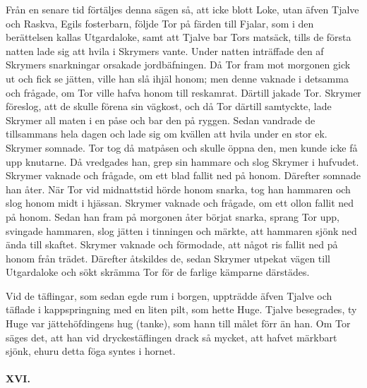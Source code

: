 Från en senare tid förtäljes denna sägen så, att icke blott Loke, utan
äfven Tjalve och Raskva, Egils fosterbarn, följde Tor på färden till
Fjalar, som i den berättelsen kallas Utgardaloke, samt att Tjalve bar
Tors matsäck, tills de första
\protect\hypertarget{lb1625905.xhtmlux5cux23start45}{}{}\protect\hypertarget{lb1625905.xhtmlux5cux23start45-a}{}{}\protect\hypertarget{lb1625905.xhtmlux5cux23start45-b}{}{}\protect\hypertarget{lb1625905.xhtmlux5cux23start45-c}{}{}\protect\hypertarget{lb1625905.xhtmlux5cux23start45-d}{}{}
natten lade sig att hvila i Skrymers vante. Under natten inträffade den
af Skrymers snarkningar orsakade jordbäfningen. Då Tor fram mot morgonen
gick ut och fick se jätten, ville han slå ihjäl honom; men denne vaknade
i detsamma och frågade, om Tor ville hafva honom till reskamrat. Därtill
jakade Tor. Skrymer föreslog, att de skulle förena sin vägkost, och då
Tor därtill samtyckte, lade Skrymer all maten i en påse och bar den på
ryggen. Sedan vandrade de tillsammans hela dagen och lade sig om kvällen
att hvila under en stor ek. Skrymer somnade. Tor tog då matpåsen och
skulle öppna den, men kunde icke få upp knutarne. Då vredgades han, grep
sin hammare och slog Skrymer i hufvudet. Skrymer vaknade och frågade, om
ett blad fallit ned på honom. Därefter somnade han åter. När Tor vid
midnattstid hörde honom snarka, tog han hammaren och slog honom midt i
hjässan. Skrymer vaknade och frågade, om ett ollon fallit ned på honom.
Sedan han fram på morgonen åter börjat snarka, sprang Tor upp, svingade
hammaren, slog jätten i tinningen och märkte, att hammaren sjönk ned
ända till skaftet. Skrymer vaknade och förmodade, att något ris fallit
ned på honom från trädet. Därefter åtskildes de, sedan Skrymer utpekat
vägen till Utgardaloke och sökt skrämma Tor för de farlige kämparne
därstädes.

Vid de täflingar, som sedan egde rum i borgen, uppträdde äfven Tjalve
och täflade i kappspringning med en liten pilt, som hette Huge. Tjalve
besegrades, ty Huge var jättehöfdingens hug (tanke), som hann till målet
förr än han. Om Tor säges det, att han vid dryckestäflingen drack så
mycket, att hafvet märkbart sjönk, ehuru detta föga syntes i hornet.

\protect\hypertarget{lb1625905.xhtmlux5cux23start46}{}{}\protect\hypertarget{lb1625905.xhtmlux5cux23start46-a}{}{}\protect\hypertarget{lb1625905.xhtmlux5cux23start46-b}{}{}\protect\hypertarget{lb1625905.xhtmlux5cux23start46-c}{}{}\protect\hypertarget{lb1625905.xhtmlux5cux23start46-d}{}{}

\paragraph{XVI.}

